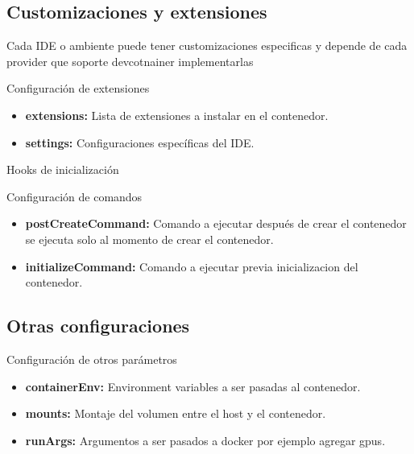 \documentclass{beamer}
\begin{document}
\subsection{Customizaciones y extensiones}
\begin{frame}{\subsecname}
Cada IDE o ambiente puede tener customizaciones especificas y depende de cada provider que soporte devcotnainer implementarlas

\begin{block}{Configuración de extensiones}
  \begin{itemize}
    \item \textbf{extensions:} Lista de extensiones a instalar en el contenedor.
    \item \textbf{settings:} Configuraciones específicas del IDE.
  \end{itemize}
\end{block}
\end{frame}
\begin{frame}{Hooks de inicialización}
  
  \begin{block}{Configuración de comandos}
    \begin{itemize}
      \item \textbf{postCreateCommand:} Comando a ejecutar después de crear el contenedor se ejecuta solo al momento de crear el contenedor.
      \item \textbf{initializeCommand:} Comando a ejecutar previa inicializacion del contenedor.
    \end{itemize}
  \end{block}
\end{frame}
\subsection{Otras configuraciones}
\begin{frame}{\subsecname}
  
  \begin{block}{Configuración de otros parámetros}
    \begin{itemize}
      \item \textbf{containerEnv:} Environment variables a ser pasadas al contenedor.
      \item \textbf{mounts:} Montaje del volumen entre el host y el contenedor.
      \item \textbf{runArgs:} Argumentos a ser pasados a docker por ejemplo agregar gpus.
    \end{itemize}
  \end{block}
\end{frame}
\end{document}
